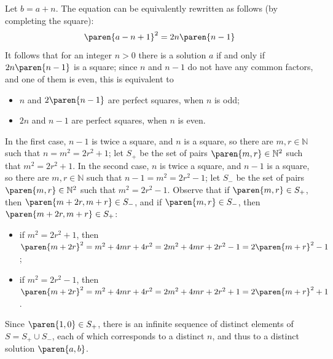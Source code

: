 Let $b = a + n$.
The equation can be equivalently rewritten as follows (by completing the square):
\begin{equation*}
  \paren{a - n + 1}^2 = 2 n \paren{n - 1}
\end{equation*}
It follows that for an integer $n > 0$ there is a solution $a$ if and only if $2 n \paren{n - 1}$ is a square;
since $n$ and $n - 1$ do not have any common factors, and one of them is even, this is equivalent to
\begin{itemize}
  \item[--] $n$ and $2 \paren{n - 1}$ are perfect squares, when $n$ is odd;
  \item[--] $2 n$ and $n - 1$ are perfect squares, when $n$ is even.
\end{itemize}
In the first case, $n - 1$ is twice a square, and $n$ is a square,
so there are $m, r \in \mathbb{N}$ such that $n = m^2 = 2 r^2 + 1$;
let $S_{+}$ be the set of pairs $\paren{m, r} \in \mathbb{N}^2$ such that $m^2 = 2 r^2 + 1$.
In the second case, $n$ is twice a square, and $n - 1$ is a square,
so there are $m, r \in \mathbb{N}$ such that $n - 1 = m^2 = 2 r^2 - 1$;
let $S_{-}$ be the set of pairs $\paren{m, r} \in \mathbb{N}^2$ such that $m^2 = 2 r^2 - 1$.
Observe that if $\paren{m, r} \in S_{+}$, then $\paren{m + 2 r, m + r} \in S_{-}$,
and if $\paren{m, r} \in S_{-}$, then $\paren{m + 2 r, m + r} \in S_{+}$:
\begin{itemize}
  \item[--] if $m^2 = 2 r^2 + 1$, then $\paren{m + 2 r}^2 = m^2 + 4 m r + 4 r^2 = 2 m^2 + 4 m r + 2 r^2 - 1 = 2 \paren{m + r}^2 - 1$;
  \item[--] if $m^2 = 2 r^2 - 1$, then $\paren{m + 2 r}^2 = m^2 + 4 m r + 4 r^2 = 2 m^2 + 4 m r + 2 r^2 + 1 = 2 \paren{m + r}^2 + 1$.
\end{itemize}
Since $\paren{1, 0} \in S_{+}$, there is an infinite sequence of distinct elements of $S = S_{+} \cup S_{-}$,
each of which corresponds to a distinct $n$, and thus to a distinct solution $\paren{a, b}$.

